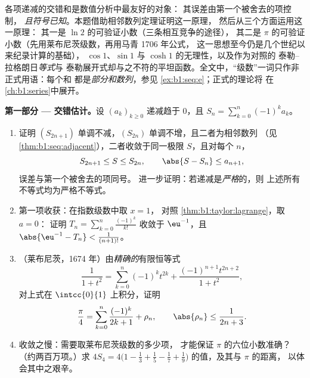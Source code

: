 \begin{problem}
\label{pb:b1:taylor:1}
各项递减的交错和是数值分析中最友好的对象：
其误差由第一个被舍去的项控制，
\emph{且符号已知}。本题借助相邻数列定理证明这一原理，
然后从三个方面运用这一原理：
其一是 $\ln 2$ 的可验证小数（三条相互竞争的途径），
其二是 $\pi$ 的可验证小数（先用莱布尼茨级数，再用马青 1706 年公式，
这一思想至今仍是几个世纪以来纪录计算的基础），
$\cos 1$、$\sin 1$ 与 $\cosh 1$ 的无理性，以及作为对照的
泰勒–拉格朗日\emph{等式}与
泰勒展开式却与之不符的平坦函数。全文中，“级数”一词只作非正式用语：每个和
都是\emph{部分和数列}，参见
\cref{ex:b1:seq:e}；正式的理论将
在\cref{ch:b1:series}中展开。

\medskip
\noindent\textbf{第一部分 --- 交错估计。}设
$(a_k)_{k \geq 0}$ 递减趋于 $0$，且 $S_n = \sum_{k=0}^{n}
(-1)^k a_k$。
\begin{enumerate}
  \item 证明 $(S_{2n+1})$ 单调不减，$(S_{2n})$
        单调不增，且二者为相邻数列
        （见\cref{thm:b1:seq:adjacent}），二者收敛于同一极限
        $S$，且对每个 $n$，
        \[
        S_{2n+1} \leq S \leq S_{2n},
        \qquad
        \abs{S - S_n} \leq a_{n+1} ,
        \]
        误差与第一个被舍去的项同号。
        进一步证明：若递减是\emph{严格}的，则
        上述所有不等式均为严格不等式。
  \item 第一项收获：在指数级数中取 $x = 1$，
        对照 \cref{thm:b1:taylor:lagrange}，取 $a = 0$：
        证明 $T_n = \sum_{k=0}^{n} \frac{(-1)^k}{k!}$
        收敛于 $\eu^{-1}$，且 $\abs{\eu^{-1} - T_n} <
        \frac{1}{(n+1)!}$。
  \item （莱布尼茨，1674 年）由\emph{精确的}有限恒等式
        \[
        \frac{1}{1 + t^2} = \sum_{k=0}^{n} (-1)^k t^{2k}
        + \frac{(-1)^{n+1} t^{2n+2}}{1 + t^2} ,
        \]
        对上式在 $\intcc{0}{1}$ 上积分，证明
        \[
        \frac\pi4 = \sum_{k=0}^{n} \frac{(-1)^k}{2k+1} + \rho_n,
        \qquad \abs{\rho_n} \leq \frac{1}{2n+3} .
        \]
  \item 收敛之慢：需要取莱布尼茨级数的多少项，
        才能保证 $\pi$ 的六位小数准确？（约两百万项。）求 $4 S_4
        = 4\bigl(1 - \frac13 + \frac15 - \frac17 +
        \frac19\bigr)$ 的值，及其与 $\pi$ 的距离，
        以体会其中之艰辛。
\end{enumerate}


\end{problem}
